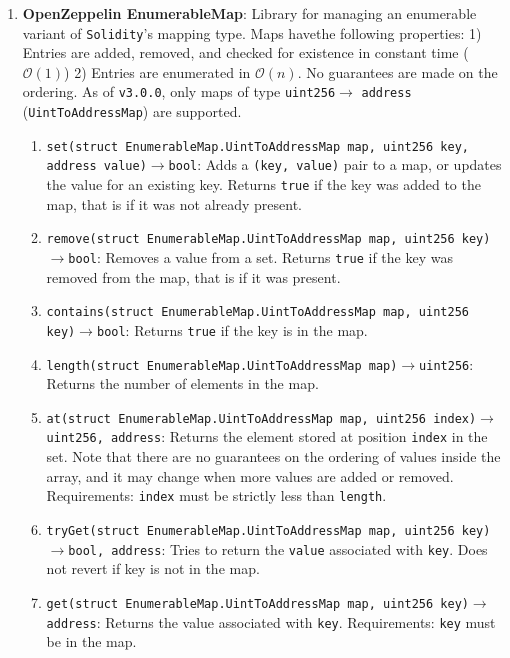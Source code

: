 \begin{enumerate}
\item\textbf{OpenZeppelin EnumerableMap}: Library for managing an enumerable variant of \verb|Solidity|’s mapping type. Maps havethe following properties: 1) Entries are added, removed, and checked for existence in constant time ($\mathcal{O}(1)$) 2) Entries are enumerated in $\mathcal{O}(n)$. No guarantees are made on the ordering. As of \verb|v3.0.0|, only maps of type \verb|uint256|$\rightarrow$ \verb|address| (\verb|UintToAddressMap|) are supported.
	\begin{enumerate}
	\item\verb|set(struct EnumerableMap.UintToAddressMap map, uint256 key, address value)|$\rightarrow$\verb|bool|: Adds a \verb|(key, value)| pair to a map, or updates the value for an existing key. Returns \verb|true| if the key was added to the map, that is if it was not already present.
	\item\verb|remove(struct EnumerableMap.UintToAddressMap map, uint256 key)|$\rightarrow$\verb|bool|: Removes a value from a set. Returns \verb|true| if the key was removed from the map, that is if it was present.
	\item\verb|contains(struct EnumerableMap.UintToAddressMap map, uint256 key)|$\rightarrow$\verb|bool|: Returns \verb|true| if the key is in the map.
	\item\verb|length(struct EnumerableMap.UintToAddressMap map)|$\rightarrow$\verb|uint256|: Returns the number of elements in the map.
	\item\verb|at(struct EnumerableMap.UintToAddressMap map, uint256 index)|$\rightarrow$\verb|uint256, address|: Returns the element stored at position \verb|index| in the set. Note that there are no guarantees on the ordering of values inside the array, and it may change when more values are added or removed. Requirements: \verb|index| must be strictly less than \verb|length|.
	\item\verb|tryGet(struct EnumerableMap.UintToAddressMap map, uint256 key)|$\rightarrow$\verb|bool, address|: Tries to return the \verb|value| associated with \verb|key|. Does not revert if key is not in the map.
	\item\verb|get(struct EnumerableMap.UintToAddressMap map, uint256 key)|$\rightarrow$\verb|address|: Returns the value associated with \verb|key|. Requirements: \verb|key| must be in the map.
	\end{enumerate}


\end{enumerate}
